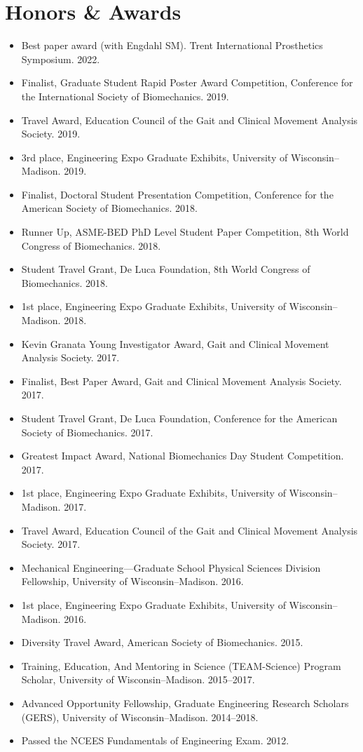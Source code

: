 \documentclass[letterpaper, 10pt]{article}
\begin{document}
\section{Honors \& Awards}
\begin{itemize}
    \item Best paper award (with Engdahl SM). Trent International Prosthetics Symposium. 2022.
    \item Finalist, Graduate Student Rapid Poster Award Competition, Conference for the International Society of Biomechanics. 2019.
    \item Travel Award, Education Council of the Gait and Clinical Movement Analysis Society. 2019.
    \item 3rd place, Engineering Expo Graduate Exhibits, University of Wisconsin--Madison. 2019.
    \item Finalist, Doctoral Student Presentation Competition, Conference for the American Society of Biomechanics. 2018.
    \item Runner Up, ASME-BED PhD Level Student Paper Competition, 8th World Congress of Biomechanics. 2018.
    \item Student Travel Grant, De Luca Foundation, 8th World Congress of Biomechanics. 2018. 
    \item 1st place, Engineering Expo Graduate Exhibits, University of Wisconsin--Madison. 2018.
    \item Kevin Granata Young Investigator Award, Gait and Clinical Movement Analysis Society. 2017. 
    \item Finalist, Best Paper Award, Gait and Clinical Movement Analysis Society. 2017.
    \item Student Travel Grant, De Luca Foundation, Conference for the American Society of Biomechanics. 2017.
    \item Greatest Impact Award, National Biomechanics Day Student Competition. 2017. 
    \item 1st place, Engineering Expo Graduate Exhibits, University of Wisconsin--Madison. 2017. 
    \item Travel Award, Education Council of the Gait and Clinical Movement Analysis Society. 2017.
    \item Mechanical Engineering---Graduate School Physical Sciences Division Fellowship, University of Wisconsin--Madison. 2016.
    \item 1st place, Engineering Expo Graduate Exhibits, University of Wisconsin--Madison. 2016.
    \item Diversity Travel Award, American Society of Biomechanics. 2015. 
    \item Training, Education, And Mentoring in Science (TEAM-Science) Program Scholar, University of Wisconsin--Madison. 2015--2017.
    \item Advanced Opportunity Fellowship, Graduate Engineering Research Scholars (GERS), University of Wisconsin--Madison. 2014--2018.
    \item Passed the NCEES Fundamentals of Engineering Exam. 2012.
\end{itemize}
\end{document}
